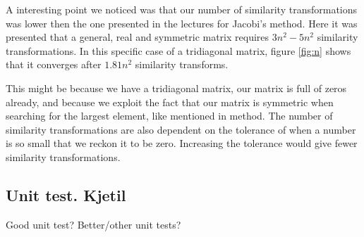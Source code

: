 A interesting point we noticed was that our number of similarity transformations was lower then the one presented in the lectures for Jacobi's method. Here it was presented that a general, real and symmetric matrix requires $ 3n^2-5n^2 $ similarity transformations. In this specific case of a  tridiagonal matrix, figure \ref{fig:n} shows that it converges after $ 1.81n^2 $ similarity transforms. 

  This might be because we have a tridiagonal matrix, our matrix is full of zeros already, and because we exploit the fact that our matrix is symmetric when searching for the largest element, like mentioned in method. The number of similarity transformations are also dependent on the tolerance of when a number is so small that we reckon it to be zero. Increasing the tolerance would give fewer similarity transformations. 
\subsection{Unit test. Kjetil}

Good unit test? Better/other unit tests?

